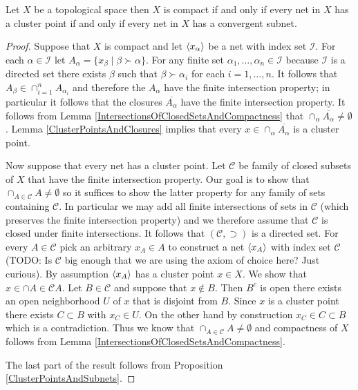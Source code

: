 \begin{thm}\label{CompactnessAndNets}Let $X$ be a topological space then $X$ is compact if and only if every net in $X$ has a cluster point if and only if every net in $X$ has a convergent subnet.
\end{thm}
\begin{proof}
Suppose that $X$ is compact and let $\langle x_{\alpha} \rangle$ be a net with index set $\mathcal{I}$.  For each $\alpha \in \mathcal{I}$ let $A_\alpha = \lbrace x_\beta \mid \beta \succ \alpha \rbrace$.  For any finite set $\alpha_1, \dotsc, \alpha_n \in \mathcal{I}$ because $\mathcal{I}$ is a directed set there exists $\beta$ such that $\beta \succ \alpha_i$ for each $i =1 , \dotsc, n$.  It follows that $A_\beta \in \cap_{i=1}^n A_{\alpha_i}$ and therefore the $A_\alpha$ have the finite intersection property; in particular it follows that the closures $\overline{A_\alpha}$ have the finite intersection property.  It follows from Lemma \ref{IntersectionsOfClosedSetsAndCompactness} that $\cap_{\alpha} \overline{A_\alpha} \neq \emptyset$.  Lemma \ref{ClusterPointsAndClosures} implies that every  $x \in \cap_{\alpha} \overline{A_\alpha}$ is a cluster point.

Now suppose that every net has a cluster point.  Let $\mathcal{C}$ be family of closed subsets of $X$ that have the finite intersection property.  Our goal is to show that $\cap_{A \in \mathcal{C}} A \neq \emptyset$ so it suffices to show the latter property for any family of sets containing $\mathcal{C}$.  In particular we may add all finite intersections of sets in $\mathcal{C}$ (which preserves the finite intersection property) and we therefore assume that $\mathcal{C}$ is closed under finite intersections.  It follows that $(\mathcal{C}, \supset)$ is a directed set.  For every $A \in \mathcal{C}$ pick an arbitrary $x_A \in A$ to construct a net $\langle x_{A} \rangle$ with index set $\mathcal{C}$ (TODO: Is $\mathcal{C}$ big enough that we are using the axiom of choice here?   Just curious).  By assumption $\langle x_{A} \rangle$ has 
a cluster point $x \in X$.   We show that $x \in \cap{A \in \mathcal{C}} A$.  Let $B \in \mathcal{C}$ and suppose that $x \notin B$.  Then $B^c$ is open there exists an open neighborhood $U$ of $x$ that is disjoint from $B$.  Since $x$ is a cluster point there exists $C \subset B$ with $x_C \in U$.  On the other hand by construction $x_C \in C \subset B$ which is a contradiction.  Thus we know that $\cap_{A \in \mathcal{C}} A \neq \emptyset$ and compactness of $X$ follows from Lemma \ref{IntersectionsOfClosedSetsAndCompactness}.

The last part of the result follows from Proposition \ref{ClusterPointsAndSubnets}.
\end{proof}


